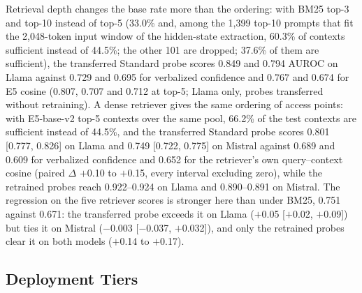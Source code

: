 \documentclass[acmsmall,screen,review]{acmart}
\begin{document}
Retrieval depth changes the base rate more than the ordering: with BM25 top-3 and top-10 instead of top-5 (33.0\% and, among the 1,399 top-10 prompts that fit the 2,048-token input window of the hidden-state extraction, 60.3\% of contexts sufficient instead of 44.5\%; the other 101 are dropped; 37.6\% of them are sufficient), the transferred Standard probe scores 0.849 and 0.794 AUROC on Llama against 0.729 and 0.695 for verbalized confidence and 0.767 and 0.674 for E5 cosine (0.807, 0.707 and 0.712 at top-5; Llama only, probes transferred without retraining). A dense retriever gives the same ordering of access points: with E5-base-v2 top-5 contexts over the same pool, 66.2\% of the test contexts are sufficient instead of 44.5\%, and the transferred Standard probe scores 0.801 [0.777, 0.826] on Llama and 0.749 [0.722, 0.775] on Mistral against 0.689 and 0.609 for verbalized confidence and 0.652 for the retriever's own query--context cosine (paired $\Delta$ $+$0.10 to $+$0.15, every interval excluding zero), while the retrained probes reach 0.922--0.924 on Llama and 0.890--0.891 on Mistral. The regression on the five retriever scores is stronger here than under BM25, 0.751 against 0.671: the transferred probe exceeds it on Llama ($+$0.05 [$+$0.02, $+$0.09]) but ties it on Mistral ($-$0.003 [$-$0.037, $+$0.032]), and only the retrained probes clear it on both models ($+$0.14 to $+$0.17).

\subsection{Deployment Tiers}
\label{sec:sprobe_results}
\end{document}
